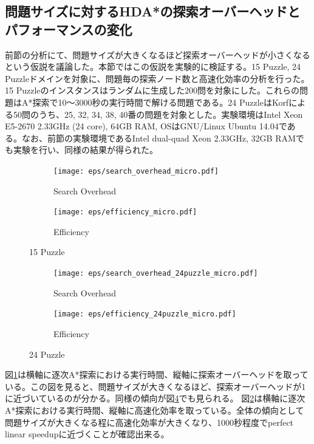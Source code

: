 \documentclass[uplatex]{jsarticle}
\begin{document}
\subsection{問題サイズに対するHDA*の探索オーバーヘッドとパフォーマンスの変化}
\label{sec:speedup_size}
前節の分析にて、問題サイズが大きくなるほど探索オーバーヘッドが小さくなるという仮説を議論した。本節ではこの仮説を実験的に検証する。15 Puzzle, 24 Puzzleドメインを対象に、問題毎の探索ノード数と高速化効率の分析を行った。15 Puzzleのインスタンスはランダムに生成した200問を対象にした。これらの問題はA*探索で10～3000秒の実行時間で解ける問題である。24 PuzzleはKorfによる50問のうち、25, 32, 34, 38, 40番の問題を対象とした\cite{Korf2002}。実験環境はIntel Xeon E5-2670 2.33GHz (24 core), 64GB RAM, OSはGNU/Linux Ubuntu 14.04である。なお、前節の実験環境であるIntel dual-quad Xeon 2.33GHz, 32GB RAMでも実験を行い、同様の結果が得られた。

\begin{figure}
	\centering
	\begin{subfigure}{0.45\columnwidth}
		\texttt{[image: eps/search\_overhead\_micro.pdf]}	
		\caption{Search Overhead}
		\label{fig:david_so}
	\end{subfigure}
	\begin{subfigure}{0.45\columnwidth}
		\texttt{[image: eps/efficiency\_micro.pdf]}	
		\caption{Efficiency}
		\label{fig:david_speedup}
	\end{subfigure}
	\caption{15 Puzzle}
	\label{fig:15_david}
\end{figure}

\begin{figure}
	\centering
	\begin{subfigure}{0.45\columnwidth}
		\texttt{[image: eps/search\_overhead\_24puzzle\_micro.pdf]}	
		\caption{Search Overhead}
		\label{fig:david_so_24}
	\end{subfigure}
	\begin{subfigure}{0.45\columnwidth}
		\texttt{[image: eps/efficiency\_24puzzle\_micro.pdf]}	
		\caption{Efficiency}
		\label{fig:david_speedup_24}
	\end{subfigure}
	\caption{24 Puzzle}
	\label{fig:24_david}
\end{figure}
図\ref{fig:david_so}は横軸に逐次A*探索における実行時間、縦軸に探索オーバーヘッドを取っている。この図を見ると、問題サイズが大きくなるほど、探索オーバーヘッドが1に近づいているのが分かる。同様の傾向が図\ref{fig:david_so_24}でも見られる。
図\ref{fig:david_speedup}は横軸に逐次A*探索における実行時間、縦軸に高速化効率を取っている。全体の傾向として問題サイズが大きくなる程に高速化効率が大きくなり、1000秒程度でperfect linear speedupに近づくことが確認出来る。 %
\newline
\end{document}
